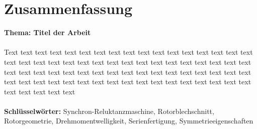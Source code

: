 \section*{Zusammenfassung}
\vspace*{0.2cm} 
\textbf{Thema: Titel der Arbeit}\\
\\
Text text text text text text text text text text text text text text text text text text text text text text text text text text text text text text text text text text text text text text text text text text text text text text text text text text text text text text text text text text text text text text text text text text text text text text text text text\\
\\\textbf{Schlüsselwörter:} Synchron-Reluktanzmaschine, Rotorblechschnitt, Rotorgeometrie, Drehmomentwelligkeit, Serienfertigung, Symmetrieeigenschaften
